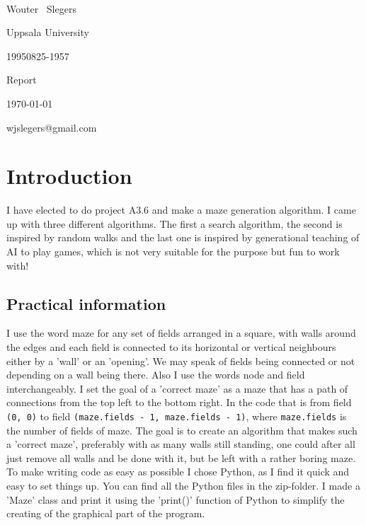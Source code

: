 \documentclass[10pt, a4paper, twoside]{amsart}
\makeatletter
\newcommand{\1}{\mathbbm{1}}
\newcommand\textbox[1]{
  \parbox{.333\textwidth}{#1}}
\newcommand{\courseName} {A3.6 Maze Generation}
\newcommand{\firstName}  {Wouter}
\newcommand{\lastName}   {Slegers}
\newcommand{\studId}     {19950825-1957}
\renewcommand{\email}    {wjslegers@gmail.com}
\makeatother
\begin{document}
\noindent{\huge\bf \courseName}\\
\noindent\textbox{\sc \firstName~ \lastName \hfill}\textbox{\hfil Uppsala University \hfil}\textbox{\hfill \studId}
\noindent\textbox{\large\sc Report \hfill}\textbox{\hfil \today \hfil}\textbox{\hfill \email}
\bigskip


\section*{Introduction}
I have elected to do project A3.6 and make a maze generation algorithm. I came up with three different algorithms. The first a search algorithm, the second is inspired by random walks and the last one is inspired by generational teaching of AI to play games, which is not very suitable for the purpose but fun to work with!

\subsection*{Practical information}
I use the word maze for any set of fields arranged in a square, with walls around the edges and each field is connected to its horizontal or vertical neighbours either by a 'wall' or an 'opening'. We may speak of fields being connected or not depending on a wall being there. Also I use the words node and field interchangeably.
I set the goal of a 'correct maze' as a maze that has a path of connections from the top left to the bottom right. In the code that is from field \verb+(0, 0)+ to field \verb+(maze.fields - 1, maze.fields - 1)+, where \verb+maze.fields+ is the number of fields of maze. The goal is to create an algorithm that makes such a 'correct maze', preferably with as many walls still standing, one could after all just remove all walls and be done with it, but be left with a rather boring maze.\\

To make writing code as easy as possible I chose Python, as I find it quick and easy to set things up. 
You can find all the Python files in the zip-folder.
I made a 'Maze' class and print it using the 'print()' function of Python to simplify the creating of the graphical part of the program.
\end{document}
